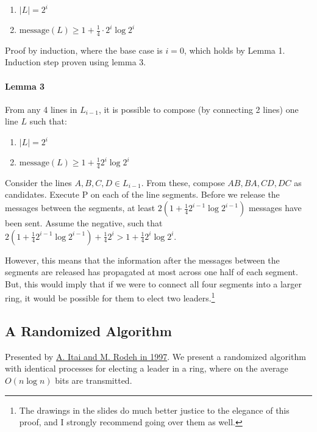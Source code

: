 \documentclass{idc_msc}
\begin{document}
\begin{enumerate}
  \item $|L|=2^i$
  \item $\text{message}(L) \ge 1 + \frac{1}{4} \cdot 2^i \log 2^i$
\end{enumerate}


Proof by induction, where the base case is $i=0$, which holds by Lemma 1.
Induction step proven using lemma 3.

\paragraph{Lemma 3}
From any 4 lines in $L_{i-1}$, it is possible to compose (by connecting 2 lines) one line $L$ such that:

\begin{enumerate}
  \item $|L| = 2^i$
  \item $\text{message}(L) \ge 1 + \frac{1}{4}2^i \log 2^i$
\end{enumerate}

Consider the lines $A,B,C,D \in L_{i-1}$. From these, compose $AB,BA,CD,DC$ as candidates.
Execute P on each of the line segments.
Before we release the messages between the segments, at least $2(1 + \frac{1}{4} 2^{i-1} \log 2^{i-1})$ messages have been sent.
Assume the negative, such that $2(1 + \frac{1}{4} 2^{i-1} \log 2^{i-1}) + \frac{1}{4}2^i > 1 + \frac{1}{4} 2^i \log 2^i$.

However, this means that the information after the messages between the segments are released has propagated at most across one half of each segment.
But, this would imply that if we were to connect all four segments into a larger ring, it would be possible for them to elect two leaders.\footnote{The drawings in the slides do much better justice to the elegance of this proof, and I strongly recommend going over them as well.}

\subsection{A Randomized Algorithm}
Presented by \href{http://www.cs.technion.ac.il/~itai/publications/lord/all.pdf}{A. Itai and M. Rodeh in 1997}.
We present a randomized algorithm with identical processes for electing a leader in a ring, where on the average $O(n \log n)$ bits are transmitted.
\end{document}
